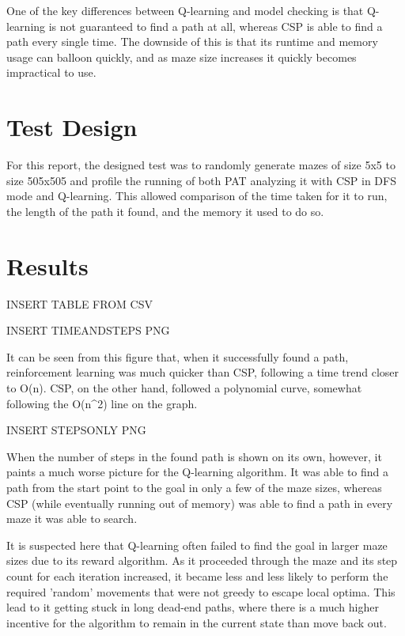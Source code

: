 \documentclass{article}
\begin{document}
        One of the key differences between Q-learning and model checking is that Q-learning is not guaranteed to find
        a path at all, whereas CSP is able to find a path every single time. The downside of this is that its runtime
        and memory usage can balloon quickly, and as maze size increases it quickly becomes impractical to use.

    \section{Test Design}\label{sec:test-design}
        For this report, the designed test was to randomly generate mazes of size 5x5 to size 505x505 and profile the
        running of both PAT analyzing it with CSP in DFS mode and Q-learning. This allowed comparison of the time taken
        for it to run, the length of the path it found, and the memory it used to do so.

    \section{Results}\label{sec:results}

        INSERT TABLE FROM CSV

        INSERT TIMEANDSTEPS PNG

         It can be seen from this figure that, when it successfully found a path, reinforcement learning was much quicker
         than CSP, following a time trend closer to O(n). CSP, on the other hand, followed a polynomial curve, somewhat
         following the O(n^2) line on the graph.

         INSERT STEPSONLY PNG

         When the number of steps in the found path is shown on its own, however, it paints a much worse picture for the
         Q-learning algorithm. It was able to find a path from the start point to the goal in only a few of the maze sizes,
         whereas CSP (while eventually running out of memory) was able to find a path in every maze it was able to search.

         It is suspected here that Q-learning often failed to find the goal in larger maze sizes due to its reward
         algorithm. As it proceeded through the maze and its step count for each iteration increased, it became less and
         less likely to perform the required 'random' movements that were not greedy to escape local optima. This lead
         to it getting stuck in long dead-end paths, where there is a much higher incentive for the algorithm to remain
         in the current state than move back out.
\end{document}
